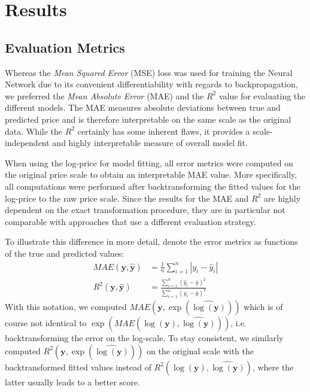 \section{Results} \label{results}

\subsection{Evaluation Metrics}

Whereas the \emph{Mean Squared Error} (MSE) loss was used for training the Neural Network due to its convenient differentiability with regards to backpropagation, we preferred the \emph{Mean Absolute Error} (MAE) and the $R^2$ value for evaluating the different models.
The MAE measures absolute deviations between true and predicted price and is therefore interpretable on the same scale as the original data.
While the $R^2$ certainly has some inherent flaws, it provides a scale-independent and highly interpretable measure of overall model fit.

When using the log-price for model fitting, all error metrics were computed on the original price scale to obtain an interpretable MAE value.
More specifically, all computations were performed after backtransforming the fitted values for the log-price to the raw price scale.
Since the results for the MAE and $R^2$ are highly dependent on the exact transformation procedure, they are in particular not comparable with approaches that use a different evaluation strategy.

To illustrate this difference in more detail, denote the error metrics as functions of the true and predicted values:
\begin{align*}
  MAE(\mathbf{y}, \hat{\mathbf{y}})
   & = \frac{1}{n}\sum_{i = 1}^{n} \left| y_i - \hat{y}_i \right|                                               \\
  R^2(\mathbf{y}, \hat{\mathbf{y}})
   & = \frac{\sum_{i=1}^{n} \left( \hat{y}_i - \bar{y}\right)^2}{\sum_{i=1}^{n} \left( y_i - \bar{y} \right)^2}
\end{align*}
With this notation, we computed $MAE \left(\mathbf{y}, \exp \left(\widehat{\log(\mathbf{y})}\right)\right)$ which is of course not identical to $\exp \left(MAE \left(\log(\mathbf{y}), \widehat{\log(\mathbf{y})}\right) \right)$, i.e. backtransforming the error on the log-scale.
To stay consistent, we similarly computed $R^2 \left(\mathbf{y}, \exp \left(\widehat{\log(\mathbf{y})}\right)\right)$ on the original scale with the backtransformed fitted values instead of  $R^2 \left(\log(\mathbf{y}), \widehat{\log(\mathbf{y})}\right)$, where the latter usually leads to a better score.



